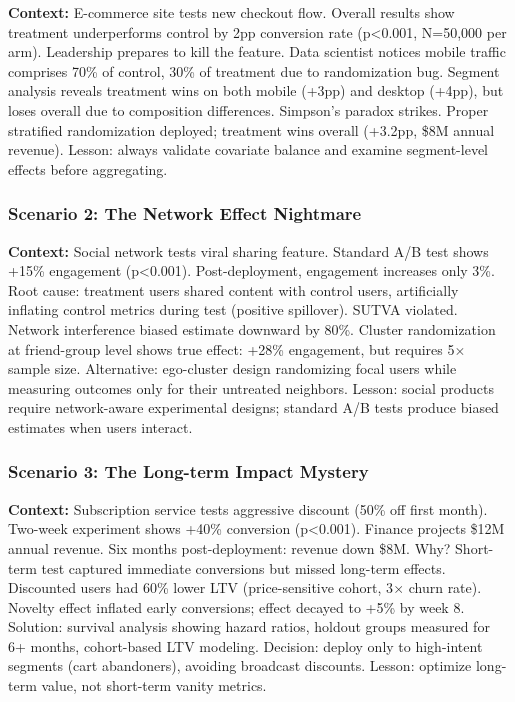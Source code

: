 \textbf{Context:} E-commerce site tests new checkout flow. Overall results show treatment underperforms control by 2pp conversion rate (p<0.001, N=50,000 per arm). Leadership prepares to kill the feature. Data scientist notices mobile traffic comprises 70\% of control, 30\% of treatment due to randomization bug. Segment analysis reveals treatment wins on both mobile (+3pp) and desktop (+4pp), but loses overall due to composition differences. Simpson's paradox strikes. Proper stratified randomization deployed; treatment wins overall (+3.2pp, \$8M annual revenue). Lesson: always validate covariate balance and examine segment-level effects before aggregating.

\subsubsection{Scenario 2: The Network Effect Nightmare}

\textbf{Context:} Social network tests viral sharing feature. Standard A/B test shows +15\% engagement (p<0.001). Post-deployment, engagement increases only 3\%. Root cause: treatment users shared content with control users, artificially inflating control metrics during test (positive spillover). SUTVA violated. Network interference biased estimate downward by 80\%. Cluster randomization at friend-group level shows true effect: +28\% engagement, but requires 5$\times$ sample size. Alternative: ego-cluster design randomizing focal users while measuring outcomes only for their untreated neighbors. Lesson: social products require network-aware experimental designs; standard A/B tests produce biased estimates when users interact.

\subsubsection{Scenario 3: The Long-term Impact Mystery}

\textbf{Context:} Subscription service tests aggressive discount (50\% off first month). Two-week experiment shows +40\% conversion (p<0.001). Finance projects \$12M annual revenue. Six months post-deployment: revenue down \$8M. Why? Short-term test captured immediate conversions but missed long-term effects. Discounted users had 60\% lower LTV (price-sensitive cohort, 3$\times$ churn rate). Novelty effect inflated early conversions; effect decayed to +5\% by week 8. Solution: survival analysis showing hazard ratios, holdout groups measured for 6+ months, cohort-based LTV modeling. Decision: deploy only to high-intent segments (cart abandoners), avoiding broadcast discounts. Lesson: optimize long-term value, not short-term vanity metrics.

